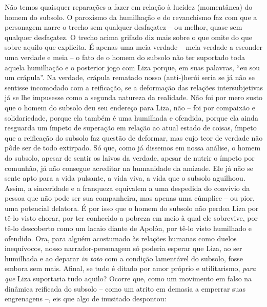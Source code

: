 Não temos quaisquer reparações a fazer em relação à lucidez (momentânea)
do homem do subsolo. O paroxismo da humilhação e do revanchismo faz com
que a personagem narre o trecho sem qualquer desfaçatez -- ou melhor,
quase sem qualquer desfaçatez. O trecho acima grifado diz mais sobre o
que omite do que sobre aquilo que explicita. É apenas uma meia verdade
-- meia verdade a esconder uma verdade e meia -- o fato de o homem do
subsolo não ter suportado toda aquela humilhação e o posterior jogo com
Liza porque, em suas palavras, ``eu sou um crápula''. Na verdade,
crápula rematado nosso (anti-)herói seria se já não se sentisse
incomodado com a reificação, se a deformação das relações
intersubjetivas já se lhe impusesse como a segunda natureza da
realidade. Não foi por mero susto que o homem do subsolo deu seu
endereço para Liza, não -- foi por compaixão e solidariedade, porque ela
também é uma humilhada e ofendida, porque ela ainda resguarda um ímpeto
de superação em relação ao atual estado de coisas, ímpeto que a
reificação do subsolo faz questão de deformar, mas cujo teor de verdade
não pôde ser de todo extirpado. Só que, como já dissemos em nossa
análise, o homem do subsolo, apesar de sentir os laivos da verdade,
apesar de nutrir o ímpeto por comunhão, já não consegue acreditar na
humanidade da amizade. Ele já não se sente apto para a vida pulsante, a
vida viva, a vida que o subsolo aguilhoou. Assim, a sinceridade e a
franqueza equivalem a uma despedida do convívio da pessoa que não pode
ser sua companheira, mas apenas uma cúmplice -- ou pior, uma potencial
delatora. É por isso que o homem do subsolo não perdoa Liza por tê-lo
visto chorar, por ter conhecido a pobreza em meio à qual ele sobrevive,
por tê-lo descoberto como um lacaio diante de Apolón, por tê-lo visto
humilhado e ofendido. Ora, para alguém acostumado às relações humanas
como duelos inequívocos, nosso narrador-personagem só poderia esperar
que Liza, ao ser humilhada e ao deparar \emph{in toto} com a condição
lamentável do subsolo, fosse embora sem mais. Afinal, se tudo é ditado
por amor próprio e utilitarismo, \emph{para que} Liza suportaria tudo
aquilo? Ocorre que, como um movimento em falso na dinâmica reificada do
subsolo -- como um atrito em demasia a emperrar suas engrenagens --, eis
que algo de inusitado despontou:

